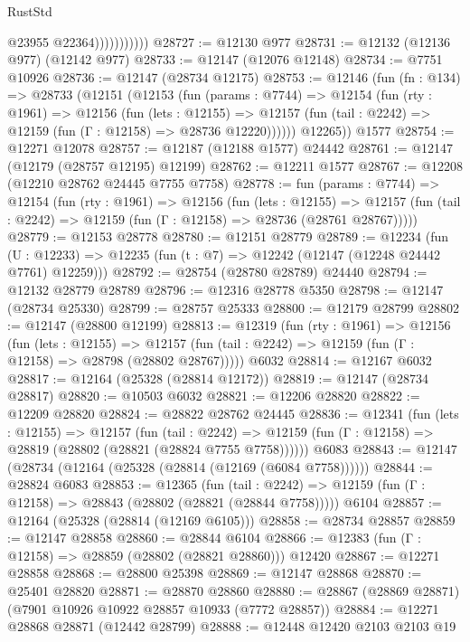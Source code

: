 \begin{lexlean}{RustStd}
\begin{coremodule}
                          @23955
                          @22364)))))))))))
@28727 := @12130 @977
@28731 := @12132 (@12136 @977) (@12142 @977)
@28733 := @12147 (@12076 @12148)
@28734 := @7751 @10926
@28736 := @12147 (@28734 @12175)
@28753 := @12146
    (fun (fn : @134) =>
    @28733
      (@12151
        (@12153
          (fun (params : @7744) =>
          @12154
            (fun (rty : @1961) =>
            @12156
              (fun (lets : @12155) =>
              @12157 (fun (tail : @2242) => @12159 (fun (Γ : @12158) => @28736 @12220))))))
        @12265))
    @1577
@28754 := @12271 @12078
@28757 := @12187 (@12188 @1577) @24442
@28761 := @12147 (@12179 (@28757 @12195) @12199)
@28762 := @12211 @1577
@28767 := @12208 (@12210 @28762 @24445 @7755 @7758)
@28778 := fun (params : @7744) =>
  @12154
    (fun (rty : @1961) =>
    @12156
      (fun (lets : @12155) =>
      @12157 (fun (tail : @2242) => @12159 (fun (Γ : @12158) => @28736 (@28761 @28767)))))
@28779 := @12153 @28778
@28780 := @12151 @28779
@28789 := @12234
    (fun (U : @12233) => @12235 (fun (t : @7) => @12242 (@12147 (@12248 @24442 @7761) @12259)))
@28792 := @28754 (@28780 @28789) @24440
@28794 := @12132 @28779 @28789
@28796 := @12316 @28778 @5350
@28798 := @12147 (@28734 @25330)
@28799 := @28757 @25333
@28800 := @12179 @28799
@28802 := @12147 (@28800 @12199)
@28813 := @12319
    (fun (rty : @1961) =>
    @12156
      (fun (lets : @12155) =>
      @12157 (fun (tail : @2242) => @12159 (fun (Γ : @12158) => @28798 (@28802 @28767)))))
    @6032
@28814 := @12167 @6032
@28817 := @12164 (@25328 (@28814 @12172))
@28819 := @12147 (@28734 @28817)
@28820 := @10503 @6032
@28821 := @12206 @28820
@28822 := @12209 @28820
@28824 := @28822 @28762 @24445
@28836 := @12341
    (fun (lets : @12155) =>
    @12157
      (fun (tail : @2242) =>
      @12159 (fun (Γ : @12158) => @28819 (@28802 (@28821 (@28824 @7755 @7758))))))
    @6083
@28843 := @12147 (@28734 (@12164 (@25328 (@28814 (@12169 (@6084 @7758))))))
@28844 := @28824 @6083
@28853 := @12365
    (fun (tail : @2242) => @12159 (fun (Γ : @12158) => @28843 (@28802 (@28821 (@28844 @7758)))))
    @6104
@28857 := @12164 (@25328 (@28814 (@12169 @6105)))
@28858 := @28734 @28857
@28859 := @12147 @28858
@28860 := @28844 @6104
@28866 := @12383 (fun (Γ : @12158) => @28859 (@28802 (@28821 @28860))) @12420
@28867 := @12271 @28858
@28868 := @28800 @25398
@28869 := @12147 @28868
@28870 := @25401 @28820
@28871 := @28870 @28860
@28880 := @28867 (@28869 @28871) (@7901 @10926 @10922 @28857 @10933 (@7772 @28857))
@28884 := @12271 @28868 @28871 (@12442 @28799)
@28888 := @12448 @12420 @2103 @2103 @19

\end{coremodule}
\end{lexlean}
